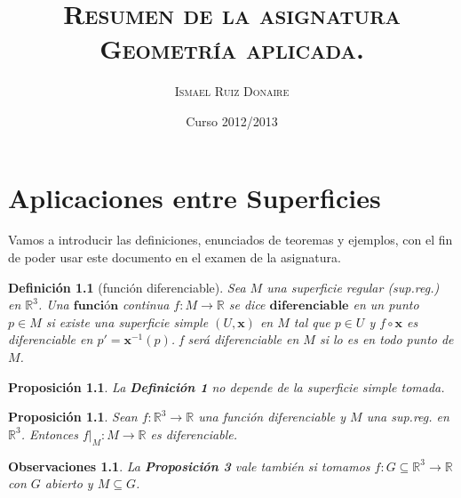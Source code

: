 \documentclass[ebook,oneside]{memoir}
\title{\textsc{Resumen de la asignatura\\ Geometría aplicada.}}
\author{\textsc{Ismael Ruiz Donaire}}
\date{Curso 2012/2013}
\newtheorem{prop}[thm]{Proposición}
\newtheorem{defn}[thm]{Definición}
\newtheorem{rem}[thm]{Observaciones}
\begin{document}
\maketitle

\tableofcontents

\listoftheorems[ignore=example]


\chapter{Aplicaciones entre Superficies}

Vamos a introducir las definiciones, enunciados de teoremas y ejemplos, con el fin de poder usar este documento en el examen de la asignatura.

\begin{defn}[función diferenciable]
Sea $M$ una superficie regular (sup.reg.) en $\mathbb{R}^3$. Una $\textbf{funci\'on}$ continua $f: M \rightarrow \mathbb{R}$ se dice $\textbf{diferenciable}$ en un punto $p \in M$ si existe una superficie simple $(U,\textbf{x})$ en $M$ tal que  $p \in U$ y $ f\circ \textbf{x}$ es diferenciable en $p' = \textbf{x}^{-1}(p)$. f ser\'a diferenciable en $M$ si lo es en todo punto de $M$.
\end{defn}

\begin{prop}
La \textup{\textbf{Definici\'on 1}} no depende de la superficie simple tomada.
\end{prop}

\begin{prop}
Sean $f: \mathbb{R}^3 \rightarrow \mathbb{R}$ una funci\'on diferenciable y $M$ una sup.reg. en $\mathbb{R}^3$. Entonces $f\vert_M : M \rightarrow \mathbb{R}$ es diferenciable.
\end{prop}

\begin{rem}
La \textbf{Proposici\'on 3} vale tambi\'en si tomamos $f: G \subseteq \mathbb{R}^3 \rightarrow \mathbb{R}$ con $G$ abierto y $M\subseteq G$.
\end{rem}
\end{document}
